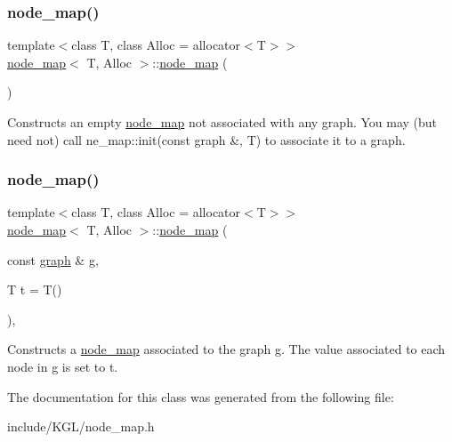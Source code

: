 \subsubsection{\texorpdfstring{node\+\_\+map()}{node\_map()}\hspace{0.1cm}{\footnotesize\ttfamily [1/2]}}
{\footnotesize\ttfamily template$<$class T, class Alloc = allocator$<$\+T$>$$>$ \\
\mbox{\hyperlink{classnode__map}{node\+\_\+map}}$<$ T, Alloc $>$\+::\mbox{\hyperlink{classnode__map}{node\+\_\+map}} (\begin{DoxyParamCaption}{ }\end{DoxyParamCaption})\hspace{0.3cm}{\ttfamily [inline]}}

Constructs an empty {\ttfamily \mbox{\hyperlink{classnode__map}{node\+\_\+map}}} not associated with any {\ttfamily graph}. You may (but need not) call {\ttfamily ne\+\_\+map\+::init(const graph \&, T)} to associate it to a {\ttfamily graph}. \mbox{\label{classnode__map_a5bd24349e3a56379592889abbe4c6b09}} 
\subsubsection{\texorpdfstring{node\+\_\+map()}{node\_map()}\hspace{0.1cm}{\footnotesize\ttfamily [2/2]}}
{\footnotesize\ttfamily template$<$class T, class Alloc = allocator$<$\+T$>$$>$ \\
\mbox{\hyperlink{classnode__map}{node\+\_\+map}}$<$ T, Alloc $>$\+::\mbox{\hyperlink{classnode__map}{node\+\_\+map}} (\begin{DoxyParamCaption}\item[{const \mbox{\hyperlink{classgraph}{graph}} \&}]{g,  }\item[{T}]{t = {\ttfamily T()} }\end{DoxyParamCaption})\hspace{0.3cm}{\ttfamily [inline]}, {\ttfamily [explicit]}}

Constructs a {\ttfamily \mbox{\hyperlink{classnode__map}{node\+\_\+map}}} associated to the graph {\ttfamily g}. The value associated to each node in {\ttfamily g} is set to {\ttfamily t}. 

The documentation for this class was generated from the following file\+:\begin{DoxyCompactItemize}
\item 
include/\+K\+G\+L/node\+\_\+map.\+h\end{DoxyCompactItemize}
